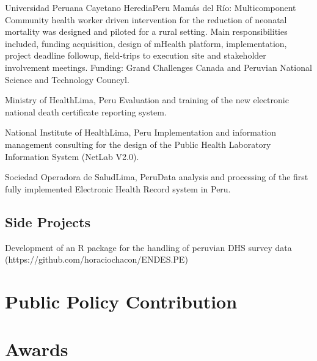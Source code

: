 \documentclass[11pt,a4paper,sans]{moderncv}
\begin{document}
        {Universidad Peruana Cayetano Heredia}{Peru}{}
        {Mamás del Río: Multicomponent Community health worker driven intervention for the reduction of neonatal mortality was designed and piloted for a rural setting. Main responsibilities included, funding acquisition, design of mHealth platform, implementation, project deadline followup, field-trips to execution site and stakeholder involvement meetings. Funding: Grand Challenges Canada and Peruvian National Science and Technology Councyl.}
        
        {Ministry of Health}{Lima, Peru}{}
        {Evaluation and training of the new electronic national death certificate reporting system.} 
        
        {National Institute of Health}{Lima, Peru}{}
        {Implementation and information management consulting for the design of the Public Health Laboratory Information System (NetLab V2.0).} 
        
        {Sociedad Operadora de Salud}{Lima, Peru}{}{Data analysis and processing of the first fully implemented Electronic Health Record system in Peru.} 

    \subsection{Side Projects}
        {Development of an R package for the handling of peruvian DHS survey data (https://github.com/horaciochacon/ENDES.PE)}

\section{Public Policy Contribution}

\section{Awards}
\end{document}
